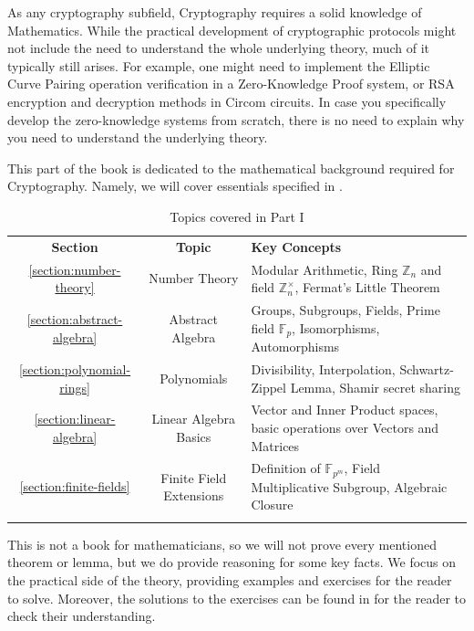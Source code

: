 \documentclass[../../../book]{subfiles}
\begin{document}
As any cryptography subfield, Cryptography requires a solid knowledge of
Mathematics. While the practical development of cryptographic protocols might
not include the need to understand the whole underlying theory, much of it
typically still arises. For example, one might need to implement the Elliptic
Curve Pairing operation verification in a Zero-Knowledge Proof system, or RSA
encryption and decryption methods in Circom circuits. In case you specifically
develop the zero-knowledge systems from scratch, there is no need to explain why
you need to understand the underlying theory.

This part of the book is dedicated to the mathematical background required for
Cryptography. Namely, we will cover essentials specified in .

\begin{table}[H]
    \centering
    \begin{tabularx}{\textwidth}{ccX}
        \Xhline{3\arrayrulewidth}
        \rowcolor{oc-indigo-3}\textbf{Section} & \textbf{Topic} & \textbf{Key Concepts} \\
        \Xhline{3\arrayrulewidth}
        \rowcolor{oc-indigo-1}\ref{section:number-theory} & Number Theory & Modular
        Arithmetic, Ring $\mathbb{Z}_n$ and field $\mathbb{Z}_n^{\times}$,
        Fermat's Little Theorem \\
        \hline
        \rowcolor{oc-indigo-2}\ref{section:abstract-algebra} & Abstract Algebra &
        Groups, Subgroups, Fields, Prime field $\mathbb{F}_p$, Isomorphisms,
        Automorphisms \\
        \hline
        \rowcolor{oc-indigo-1}\ref{section:polynomial-rings} & Polynomials & Divisibility, Interpolation, Schwartz-Zippel Lemma, Shamir secret sharing \\
        \hline
        \rowcolor{oc-indigo-2}\ref{section:linear-algebra} & Linear Algebra Basics & Vector and Inner Product spaces, basic operations over Vectors and Matrices \\
        \hline
        \rowcolor{oc-indigo-1}\ref{section:finite-fields} & Finite Field Extensions & Definition of $\mathbb{F}_{p^m}$, Field Multiplicative Subgroup, Algebraic Closure \\
        \Xhline{3\arrayrulewidth}
    \end{tabularx}
    \caption{Topics covered in Part I}
    \label{tab:essentialls}
\end{table}

This is not a book for mathematicians, so we will not prove every mentioned theorem
or lemma, but we do provide reasoning for some key facts. We
focus on the practical side of the theory, providing examples and exercises for
the reader to solve. Moreover, the solutions to the exercises can be found 
in  for the reader to check their understanding.
\end{document}

